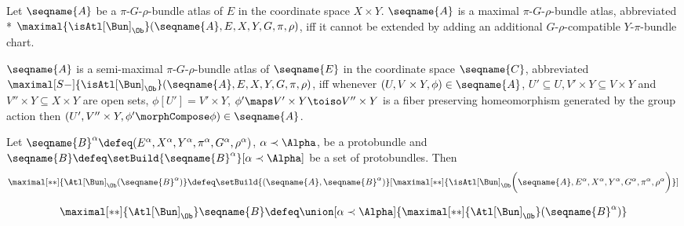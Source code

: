 \documentclass{article}
\begin{document}
\begin{definition}
\label{def:Bun-ATLmax}
Let $\seqname{A}$ be a $\pi$-$G$-$\rho$-bundle atlas of $E$ in the
coordinate space $X \times Y$. $\seqname{A}$ is a maximal
$\pi$-$G$-$\rho$-bundle atlas, abbreviated \\*
$
  \maximal{\isAtl[\Bun]_\Ob}
    (
      \seqname{A},
      E,
      X,
      Y,
      G,
      \pi,
      \rho
    )
$,
iff it cannot be extended by adding an additional $G$-$\rho$-compatible
$Y$-$\pi$-bundle chart.

$\seqname{A}$ is a semi-maximal $\pi$-$G$-$\rho$-bundle atlas
of $\seqname{E}$ in the coordinate space $\seqname{C}$, abbreviated
$
  \maximal[S-]{\isAtl[\Bun]_\Ob}
    (
      \seqname{A},
      E,
      X,
      Y,
      G,
      \pi,
      \rho
    )
$,
iff whenever $(U, V \times Y, \phi) \in \seqname{A}$,
$U' \subseteq U, V' \times Y \subseteq V \times Y$ and
$V'' \times Y \subseteq X \times Y$ are open sets,
$\phi[U'] = V' \times Y$,
$\phi' \maps V' \times Y \toiso V'' \times Y$ is a fiber
preserving homeomorphism generated by the group action then
$(U', V'' \times Y, \phi' \morphCompose \phi) \in \seqname{A}$.

Let
$
  \seqname{B}^\alpha \defeq
  (E^\alpha, X^\alpha, Y^\alpha, \pi^\alpha, G^\alpha, \rho^\alpha)
$,
$\alpha \prec \Alpha$, be a protobundle and
$\seqname{B} \defeq \setBuild{{\seqname{B}^\alpha}}[\alpha \prec \Alpha]$
be a set of protobundles.
Then
\begin{multline}
\maximal[**]{\Atl[\Bun]_\Ob(\seqname{B}^\alpha)} \defeq
  \setBuild
  {{
    (
      \seqname{A},
      \seqname{B}^\alpha
    )
  }}%
  [
    {{
      \maximal[**]
        {
          \isAtl[\Bun]_\Ob
            \biggl (
              \seqname{A},
              E^\alpha,
              X^\alpha,
              Y^\alpha,
              G^\alpha,
              \pi^\alpha,
              \rho^\alpha
            \biggr )
        }
    }}
  ]
\end{multline}

\begin{equation}
\maximal[**]{\Atl[\Bun]_\Ob} \seqname{B} \defeq
  \union
    [\alpha \prec \Alpha]
    {\maximal[**]{\Atl[\Bun]_\Ob}(\seqname{B}^\alpha)}
\end{equation}
\end{definition}
\end{document}
